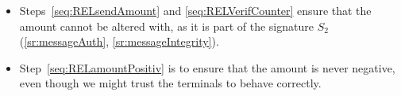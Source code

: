 \documentclass{article}
\begin{document}
\begin{itemize}
%
%
%
%
%
    \item Steps~\ref{seq:RELsendAmount} and \ref{seq:RELVerifCounter} ensure that the amount cannot be altered with, as it is part of the signature $S_2$ (\ref{sr:messageAuth}, \ref{sr:messageIntegrity}).

    \item Step~\ref{seq:RELamountPositiv} is to ensure that the amount is never negative, even though we might trust the terminals to behave correctly.
    
    \end{itemize}
\end{document}
